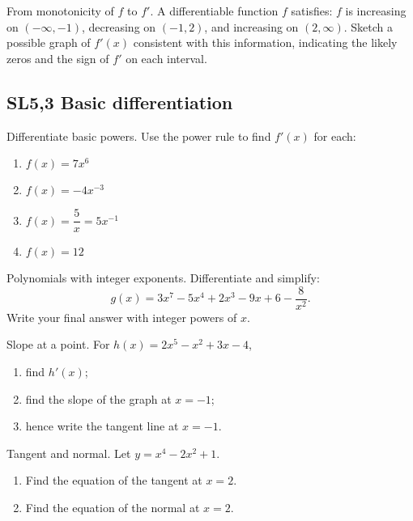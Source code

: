 \documentclass[11pt]{article}
\def\textbf#1{#1}%
\newcommand{\tocsubsection}[1]{\subsection{#1}}
\newcounter{question}
\begin{document}
\begin{question}
\textbf{From monotonicity of $f$ to $f'$.}
A differentiable function $f$ satisfies: $f$ is increasing on $(-\infty,-1)$, decreasing on $(-1,2)$, and increasing on $(2,\infty)$.  
Sketch a possible graph of $f'(x)$ consistent with this information, indicating the likely zeros and the sign of $f'$ on each interval.
\end{question}


\tocsubsection{SL5,3 Basic differentiation}


\begin{question}
\textbf{Differentiate basic powers.}
Use the power rule to find $f'(x)$ for each:
\begin{enumerate}
  \item $f(x)=7x^{6}$
  \item $f(x)=-4x^{-3}$
  \item $f(x)=\dfrac{5}{x}=5x^{-1}$
  \item $f(x)=12$
\end{enumerate}
\end{question}

\begin{question}
\textbf{Polynomials with integer exponents.}
Differentiate and simplify:
\[
g(x)=3x^{7}-5x^{4}+2x^{3}-9x+6-\frac{8}{x^{2}}.
\]
Write your final answer with integer powers of $x$.
\end{question}

\begin{question}
\textbf{Slope at a point.}
For $h(x)=2x^{5}-x^{2}+3x-4$,
\begin{enumerate}
  \item find $h'(x)$;
  \item find the slope of the graph at $x=-1$;
  \item hence write the tangent line at $x=-1$.
\end{enumerate}
\end{question}

\begin{question}
\textbf{Tangent and normal.}
Let $y=x^{4}-2x^{2}+1$.
\begin{enumerate}
  \item Find the equation of the tangent at $x=2$.
  \item Find the equation of the normal at $x=2$.
\end{enumerate}
\end{question}
\end{document}
